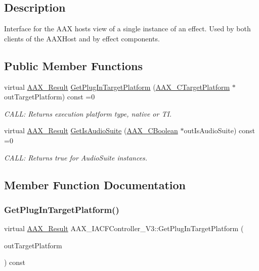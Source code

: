 \subsection{Description}
Interface for the A\+AX host\textquotesingle{}s view of a single instance of an effect. Used by both clients of the A\+A\+X\+Host and by effect components. 

\subsection*{Public Member Functions}
\begin{DoxyCompactItemize}
\item 
virtual \mbox{\hyperlink{a00392_a4d8f69a697df7f70c3a8e9b8ee130d2f}{A\+A\+X\+\_\+\+Result}} \mbox{\hyperlink{a01645_af2f012ae8fec830e52c5fca54b555a7b}{Get\+Plug\+In\+Target\+Platform}} (\mbox{\hyperlink{a00392_a8f2cefa455217fa9f3ce190fe5fd8033}{A\+A\+X\+\_\+\+C\+Target\+Platform}} $\ast$out\+Target\+Platform) const =0
\begin{DoxyCompactList}\small\item\em C\+A\+LL\+: Returns execution platform type, native or TI. \end{DoxyCompactList}\item 
virtual \mbox{\hyperlink{a00392_a4d8f69a697df7f70c3a8e9b8ee130d2f}{A\+A\+X\+\_\+\+Result}} \mbox{\hyperlink{a01645_a2511f4ddb2d0fd17f6f17fe8a6980add}{Get\+Is\+Audio\+Suite}} (\mbox{\hyperlink{a00392_aa216506530f1d19a2965931ced2b274b}{A\+A\+X\+\_\+\+C\+Boolean}} $\ast$out\+Is\+Audio\+Suite) const =0
\begin{DoxyCompactList}\small\item\em C\+A\+LL\+: Returns true for Audio\+Suite instances. \end{DoxyCompactList}\end{DoxyCompactItemize}


\subsection{Member Function Documentation}
\mbox{\label{a01645_af2f012ae8fec830e52c5fca54b555a7b}} 
\subsubsection{\texorpdfstring{GetPlugInTargetPlatform()}{GetPlugInTargetPlatform()}}
{\footnotesize\ttfamily virtual \mbox{\hyperlink{a00392_a4d8f69a697df7f70c3a8e9b8ee130d2f}{A\+A\+X\+\_\+\+Result}} A\+A\+X\+\_\+\+I\+A\+C\+F\+Controller\+\_\+\+V3\+::\+Get\+Plug\+In\+Target\+Platform (\begin{DoxyParamCaption}\item[{\mbox{\hyperlink{a00392_a8f2cefa455217fa9f3ce190fe5fd8033}{A\+A\+X\+\_\+\+C\+Target\+Platform}} $\ast$}]{out\+Target\+Platform }\end{DoxyParamCaption}) const\hspace{0.3cm}{\ttfamily [pure virtual]}}



